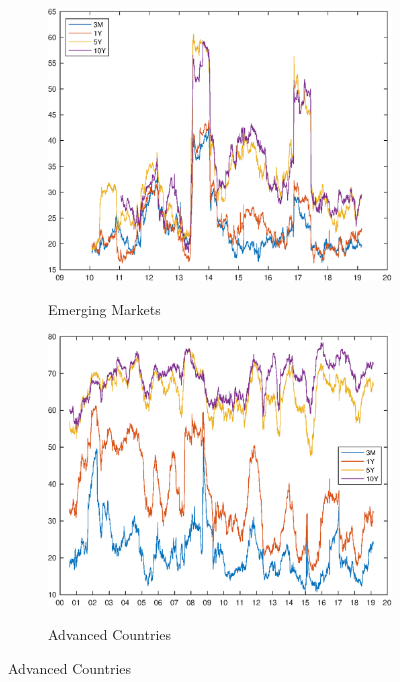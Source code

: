 \documentclass{article}
\begin{document}

\begin{figure}[tbph]
	\caption{Connectedness of the Term Structure}
	\label{fig:dy_index_ts}
	
	\begin{subfigure}[t]{\textwidth}
		\begin{center}
			\includegraphics[trim={0cm 0cm 0cm 0cm},clip,height=0.42\textheight,width=1\textwidth]{../Figures/Estimation/dy_index_ts.eps} \\
			\caption{Emerging Markets} \label{subfig:dyindexTSEM}
		\end{center}
	\end{subfigure}
	
	\begin{subfigure}[t]{\textwidth}
		\begin{center}
			\includegraphics[trim={0cm 0cm 0cm 0cm},clip,height=0.42\textheight,width=1\textwidth]{../Figures/Estimation/dy_index_ts_AE.eps} \\
			\caption{Advanced Countries} \label{subfig:dyindexTSAE}
		\end{center}
	\end{subfigure}

\end{figure}
\end{document}

